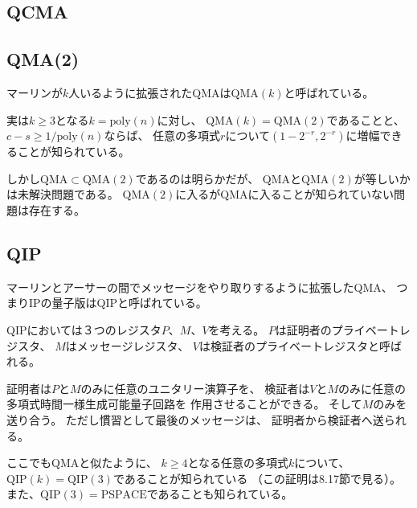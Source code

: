 \documentclass[a4paper, 10pt]{jsarticle}
\begin{document}
\subsection{QCMA}

\subsection{QMA(2)}
マーリンが$k$人いるように拡張されたQMAは$\mathrm{QMA}(k)$と呼ばれている。

実は$k \geq 3$となる$k = \mathrm{poly}(n)$に対し、
$\mathrm{QMA}(k) = \mathrm{QMA}(2)$であることと、
$c - s \geq 1/\mathrm{poly}(n)$ならば、
任意の多項式$r$について$(1 - 2^{-r}, 2^{-r})$に増幅できることが知られている。

しかし$\mathrm{QMA} \subset \mathrm{QMA}(2)$であるのは明らかだが、
QMAと$\mathrm{QMA}(2)$が等しいかは未解決問題である。
$\mathrm{QMA}(2)$に入るが$\mathrm{QMA}$に入ることが知られていない問題は存在する。

\subsection{QIP}
マーリンとアーサーの間でメッセージをやり取りするように拡張したQMA、
つまりIPの量子版はQIPと呼ばれている。

QIPにおいては３つのレジスタ$P$、$M$、$V$を考える。
$P$は証明者のプライベートレジスタ、
$M$はメッセージレジスタ、
$V$は検証者のプライベートレジスタと呼ばれる。

証明者は$P$と$M$のみに任意のユニタリー演算子を、
検証者は$V$と$M$のみに任意の多項式時間一様生成可能量子回路を
作用させることができる。
そして$M$のみを送り合う。
ただし慣習として最後のメッセージは、
証明者から検証者へ送られる。

ここでもQMAと似たように、
$k \geq 4$となる任意の多項式$k$について、
$\mathrm{QIP}(k) = \mathrm{QIP}(3)$であることが知られている
（この証明は8.17節で見る）。
また、$\mathrm{QIP}(3) = \mathrm{PSPACE}$であることも知られている。
\end{document}

